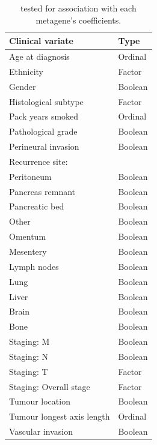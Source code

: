\documentclass[dissertation.tex]{subfiles}
\begin{document}
\begin{table}[h]
\centering
\caption{ tested for association with each metagene's coefficients. \label{tab:sigs-clinvar-table}}
\begin{tabular}{@{}ll@{}}
\toprule
Clinical variate           & Type    \\ \midrule
Age at diagnosis           & Ordinal \\
Ethnicity                  & Factor  \\
Gender                     & Boolean \\
Histological subtype       & Factor  \\
Pack years smoked          & Ordinal \\
Pathological grade         & Boolean \\
Perineural invasion        & Boolean \\
Recurrence site:           &         \\
\quad Peritoneum                 & Boolean \\
\quad Pancreas remnant           & Boolean \\
\quad Pancreatic bed             & Boolean \\
\quad Other                      & Boolean \\
\quad Omentum                    & Boolean \\
\quad Mesentery                  & Boolean \\
\quad Lymph nodes                & Boolean \\
\quad Lung                       & Boolean \\
\quad Liver                      & Boolean \\
\quad Brain                      & Boolean \\
\quad Bone                       & Boolean \\
Staging: M                 & Boolean \\
Staging: N                 & Boolean \\
Staging: T                 & Factor  \\
Staging: Overall stage     & Factor  \\
Tumour location            & Boolean \\
Tumour longest axis length & Ordinal \\
Vascular invasion          & Boolean \\
\bottomrule
\end{tabular}
\end{table}
\end{document}
